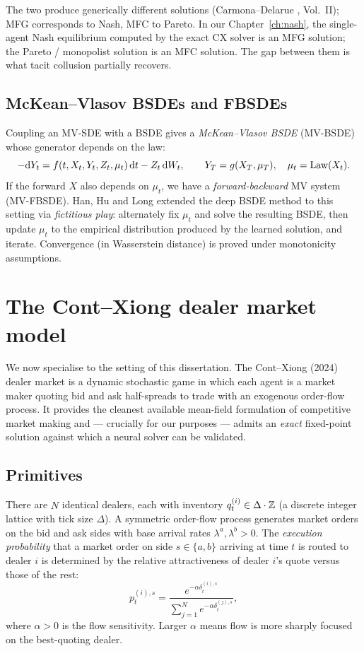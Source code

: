 The two produce generically different solutions (Carmona--Delarue \cite{carmona2018}, Vol.~II); MFG corresponds to Nash, MFC to Pareto. In our Chapter~\ref{ch:nash}, the single-agent Nash equilibrium computed by the exact CX solver is an MFG solution; the Pareto / monopolist solution is an MFC solution. The gap between them is what tacit collusion partially recovers.

\subsection{McKean--Vlasov BSDEs and FBSDEs}

Coupling an MV-SDE with a BSDE gives a \emph{McKean--Vlasov BSDE} (MV-BSDE) whose generator depends on the law:
\begin{equation}
  -\mathrm{d} Y_t = f(t, X_t, Y_t, Z_t, \mu_t) \, \mathrm{d} t - Z_t \, \mathrm{d} W_t, \qquad Y_T = g(X_T, \mu_T), \quad \mu_t = \mathrm{Law}(X_t).
\end{equation}
If the forward $X$ also depends on $\mu_t$, we have a \emph{forward-backward} MV system (MV-FBSDE). Han, Hu and Long \cite{han2022} extended the deep BSDE method to this setting via \emph{fictitious play}: alternately fix $\mu_t$ and solve the resulting BSDE, then update $\mu_t$ to the empirical distribution produced by the learned solution, and iterate. Convergence (in Wasserstein distance) is proved under monotonicity assumptions.

\section{The Cont--Xiong dealer market model}
\label{sec:cx-model}

We now specialise to the setting of this dissertation. The Cont--Xiong (2024) \cite{cont2024} dealer market is a dynamic stochastic game in which each agent is a market maker quoting bid and ask half-spreads to trade with an exogenous order-flow process. It provides the cleanest available mean-field formulation of competitive market making and --- crucially for our purposes --- admits an \emph{exact} fixed-point solution against which a neural solver can be validated.

\subsection{Primitives}

There are $N$ identical dealers, each with inventory $q^{(i)}_t \in \Delta \cdot \mathbb{Z}$ (a discrete integer lattice with tick size $\Delta$). A symmetric order-flow process generates market orders on the bid and ask sides with base arrival rates $\lambda^a, \lambda^b > 0$. The \emph{execution probability} that a market order on side $s \in \{a, b\}$ arriving at time $t$ is routed to dealer $i$ is determined by the relative attractiveness of dealer $i$'s quote versus those of the rest:
\begin{equation}
  p^{(i), s}_t = \frac{e^{-\alpha \delta^{(i), s}_t}}{\sum_{j=1}^{N} e^{-\alpha \delta^{(j), s}_t}},
  \label{eq:cx-execution}
\end{equation}
where $\alpha > 0$ is the flow sensitivity. Larger $\alpha$ means flow is more sharply focused on the best-quoting dealer.

